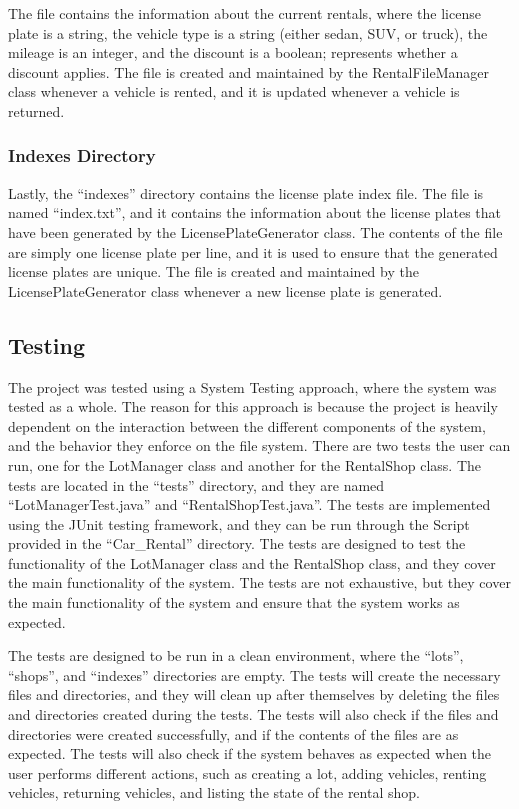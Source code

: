 \documentclass[conference]{IEEEtran}
\begin{document}
The file contains the information about the current rentals, where the license plate is a string, the vehicle type is a string (either sedan, SUV, or truck), the mileage is an integer, and the discount is a boolean; represents whether a discount applies. The file is created and maintained by the RentalFileManager class whenever a vehicle is rented, and it is updated whenever a vehicle is returned.

\subsubsection{Indexes Directory}
Lastly, the ``indexes'' directory contains the license plate index file. The file is named ``index.txt'', and it contains the information about the license plates that have been generated by the LicensePlateGenerator class. The contents of the file are simply one license plate per line, and it is used to ensure that the generated license plates are unique. The file is created and maintained by the LicensePlateGenerator class whenever a new license plate is generated.


\subsection{Testing}
The project was tested using a System Testing approach, where the system was tested as a whole. The reason for this approach is because the project is heavily dependent on the interaction between the different components of the system, and the behavior they enforce on the file system. There are two tests the user can run, one for the LotManager class and another for the RentalShop class. The tests are located in the ``tests'' directory, and they are named ``LotManagerTest.java'' and ``RentalShopTest.java''. The tests are implemented using the JUnit testing framework, and they can be run through the Script provided in the ``Car\_Rental'' directory. The tests are designed to test the functionality of the LotManager class and the RentalShop class, and they cover the main functionality of the system. The tests are not exhaustive, but they cover the main functionality of the system and ensure that the system works as expected.

The tests are designed to be run in a clean environment, where the ``lots'', ``shops'', and ``indexes'' directories are empty. The tests will create the necessary files and directories, and they will clean up after themselves by deleting the files and directories created during the tests. The tests will also check if the files and directories were created successfully, and if the contents of the files are as expected. The tests will also check if the system behaves as expected when the user performs different actions, such as creating a lot, adding vehicles, renting vehicles, returning vehicles, and listing the state of the rental shop.
\end{document}
